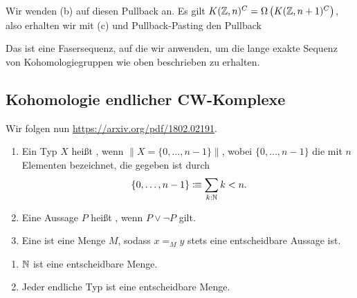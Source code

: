 \begin{beweis}
   \begin{center}
    \end{center}
    Wir wenden (b) auf diesen Pullback an.
    Es gilt \(K(\mathbb{Z},n)^C=\Omega \left(K(\mathbb{Z},n+1)^C\right)\), also erhalten wir mit (c) und Pullback-Pasting den Pullback
    \begin{center}
    \end{center}
    Das ist eine Fasersequenz, auf die wir  anwenden,
    um die lange exakte Sequenz von Ko\-homolo\-gie\-grup\-pen wie oben beschrieben zu erhalten. 
\end{beweis}

\subsection{Kohomologie endlicher CW-Komplexe}

Wir folgen nun \url{https://arxiv.org/pdf/1802.02191}.

\begin{definition}
  \begin{enumerate}
  \item Ein Typ \(X\) heißt , wenn \(\|X=\{0,\dots,n-1\}\|\), wobei \(\{0,\dots,n-1\}\) die  mit \(n\) Elementen bezeichnet, die gegeben ist durch
    \[\{0,\dots,n-1\}\colonequiv \sum_{k:\N}k< n\rlap{.}\]
  \item Eine Aussage \(P\) heißt , wenn \(P\vee \neg P\) gilt.
  \item Eine  ist eine Menge \(M\), sodass \(x=_My\) stets eine entscheidbare Aussage ist.
  \end{enumerate}
\end{definition}

\begin{beispiel}
  \begin{enumerate}
  \item \(\mathbb{N}\) ist eine entscheidbare Menge.
  \item Jeder endliche Typ ist eine entscheidbare Menge.
  \end{enumerate}
\end{beispiel}

